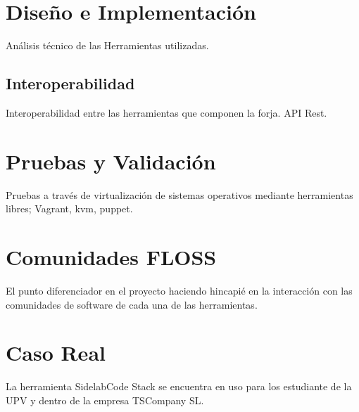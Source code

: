 \documentclass[a4paper, 12pt]{book}
\begin{document}


\chapter{Dise\~no e Implementaci\'on}
\label{chap:diseno}

\par An\'alisis t\'ecnico de las Herramientas utilizadas.


\section{Interoperabilidad}
\label{sec:interoperabilidad}

\par Interoperabilidad entre las herramientas que componen la forja. API Rest.



\chapter{Pruebas y Validaci\'on}
\label{chap:pruebas}

\par Pruebas a trav\'es de virtualizaci\'on de sistemas operativos mediante herramientas libres; Vagrant, kvm, puppet.


\chapter{Comunidades FLOSS}
\label{chap:comunidades}

\par El punto diferenciador en el proyecto haciendo hincapi\'e en la interacci\'on con las comunidades de software de cada una de las herramientas.


\chapter*{Caso Real}
\label{chap:casoreal}

\par La herramienta SidelabCode Stack se encuentra en uso para los estudiante de la UPV y dentro de la empresa TSCompany SL.
\end{document}
